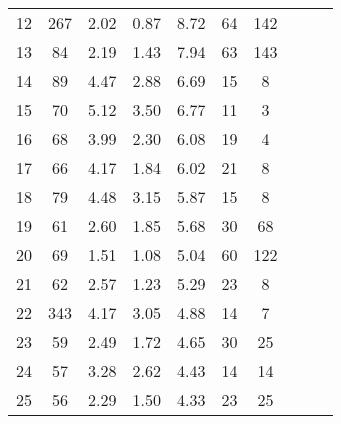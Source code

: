 \begin{tabular}{lccccccccc}
12 &      267 &                             2.02 &                             0.87 &                             8.72 &              64 &             142 \\
13 &       84 &                             2.19 &                             1.43 &                             7.94 &              63 &             143 \\
14 &       89 &                             4.47 &                             2.88 &                             6.69 &              15 &               8 \\
15 &       70 &                             5.12 &                             3.50 &                             6.77 &              11 &               3 \\
16 &       68 &                             3.99 &                             2.30 &                             6.08 &              19 &               4 \\
17 &       66 &                             4.17 &                             1.84 &                             6.02 &              21 &               8 \\
18 &       79 &                             4.48 &                             3.15 &                             5.87 &              15 &               8 \\
19 &       61 &                             2.60 &                             1.85 &                             5.68 &              30 &              68 \\
20 &       69 &                             1.51 &                             1.08 &                             5.04 &              60 &             122 \\
21 &       62 &                             2.57 &                             1.23 &                             5.29 &              23 &               8 \\
22 &      343 &                             4.17 &                             3.05 &                             4.88 &              14 &               7 \\
23 &       59 &                             2.49 &                             1.72 &                             4.65 &              30 &              25 \\
24 &       57 &                             3.28 &                             2.62 &                             4.43 &              14 &              14 \\
25 &       56 &                             2.29 &                             1.50 &                             4.33 &              23 &              25 \\

\end{tabular}

